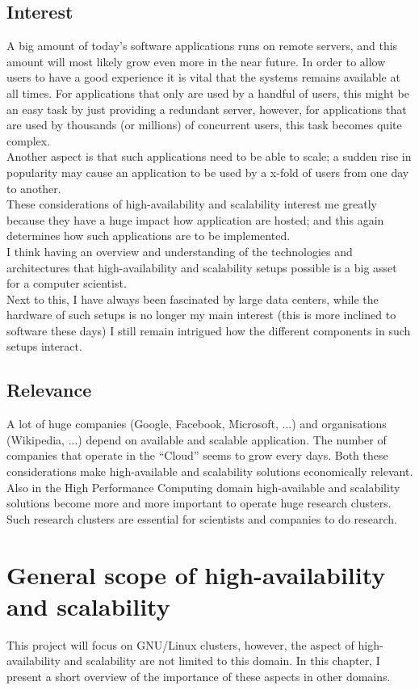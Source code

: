 \documentclass[12pt]{report}
\begin{document}
\section{Interest}
A big amount of today's software applications runs on remote servers, and
this amount will most likely grow even more in the near future. In
order to allow users to have a good experience it is vital that the
systems remains available at all times. For applications that only are
used by a handful of users, this might be an easy task by just
providing a redundant server, however, for applications that are used
by thousands (or millions) of concurrent users, this task becomes
quite complex.\\
Another aspect is that such applications need to be able to scale; a
sudden rise in popularity may cause an application to be used by a
x-fold of users from one day to another.\\
These considerations of high-availability and scalability interest me
greatly because they have a huge impact how application are
hosted; and this again determines how such applications are to be
implemented.\\
 I think having an overview and understanding of the technologies and
architectures that high-availability and scalability setups possible
is a big asset for a computer scientist.\\
Next to this, I have always been fascinated by large data centers,
while the hardware of such setups is no longer my main interest (this
is more inclined to software these days) I still remain intrigued how
the different components in such setups interact.

\section{Relevance}
A lot of huge companies (Google, Facebook, Microsoft, ...) and
organisations (Wikipedia, ...) depend on available and scalable
application. The number of companies that operate in the ``Cloud''
seems to grow every days. Both these considerations make
high-available and scalability solutions economically relevant.
Also in the High Performance Computing domain high-available and
scalability solutions become more and more important to operate huge
research clusters. Such research clusters are essential for scientists
and companies to do research.

\chapter{General scope of high-availability and scalability}
This project will focus on GNU/Linux clusters, however,
the aspect of high-availability and scalability are not limited to
this domain. In this chapter, I present a short overview of the
importance of these aspects in other domains.
\end{document}

